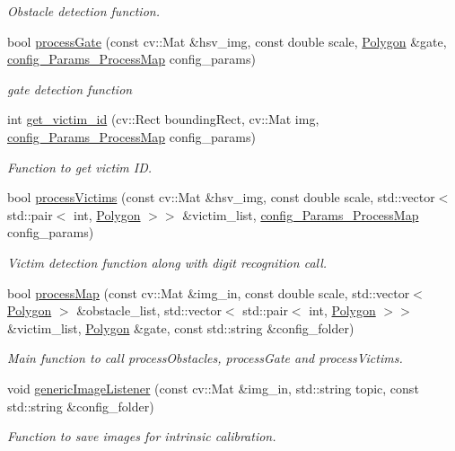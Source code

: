 \begin{DoxyCompactItemize}
\begin{DoxyCompactList}\small\item\em Obstacle detection function. \end{DoxyCompactList}\item 
bool \hyperlink{namespacestudent_abfb444a179b51148e9ad476a016f8fe3}{process\+Gate} (const cv\+::\+Mat \&hsv\+\_\+img, const double scale, \hyperlink{utils_8hpp_a18281038c49470960bd8f4d15b893441}{Polygon} \&gate, \hyperlink{classconfig__Params__ProcessMap}{config\+\_\+\+Params\+\_\+\+Process\+Map} config\+\_\+params)
\begin{DoxyCompactList}\small\item\em gate detection function \end{DoxyCompactList}\item 
int \hyperlink{namespacestudent_a4d19daafa227fb7503f8ff4111243d4d}{get\+\_\+victim\+\_\+id} (cv\+::\+Rect bounding\+Rect, cv\+::\+Mat img, \hyperlink{classconfig__Params__ProcessMap}{config\+\_\+\+Params\+\_\+\+Process\+Map} config\+\_\+params)
\begin{DoxyCompactList}\small\item\em Function to get victim ID. \end{DoxyCompactList}\item 
bool \hyperlink{namespacestudent_a6dd3cda22103f4e0c2ddb32cc68789c7}{process\+Victims} (const cv\+::\+Mat \&hsv\+\_\+img, const double scale, std\+::vector$<$ std\+::pair$<$ int, \hyperlink{utils_8hpp_a18281038c49470960bd8f4d15b893441}{Polygon} $>$$>$ \&victim\+\_\+list, \hyperlink{classconfig__Params__ProcessMap}{config\+\_\+\+Params\+\_\+\+Process\+Map} config\+\_\+params)
\begin{DoxyCompactList}\small\item\em Victim detection function along with digit recognition call. \end{DoxyCompactList}\item 
bool \hyperlink{namespacestudent_a153a17ef667d7c10b8f33d815b9bc1bc}{process\+Map} (const cv\+::\+Mat \&img\+\_\+in, const double scale, std\+::vector$<$ \hyperlink{utils_8hpp_a18281038c49470960bd8f4d15b893441}{Polygon} $>$ \&obstacle\+\_\+list, std\+::vector$<$ std\+::pair$<$ int, \hyperlink{utils_8hpp_a18281038c49470960bd8f4d15b893441}{Polygon} $>$$>$ \&victim\+\_\+list, \hyperlink{utils_8hpp_a18281038c49470960bd8f4d15b893441}{Polygon} \&gate, const std\+::string \&config\+\_\+folder)
\begin{DoxyCompactList}\small\item\em Main function to call process\+Obstacles, process\+Gate and process\+Victims. \end{DoxyCompactList}\item 
void \hyperlink{namespacestudent_a3b726e7af03a643c06dcde23057a82ea}{generic\+Image\+Listener} (const cv\+::\+Mat \&img\+\_\+in, std\+::string topic, const std\+::string \&config\+\_\+folder)
\begin{DoxyCompactList}\small\item\em Function to save images for intrinsic calibration. \end{DoxyCompactList}\end{DoxyCompactItemize}
